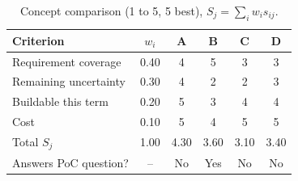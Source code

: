 \documentclass[conference]{IEEEtran}
\begin{document}
\begin{table}[H]
\centering
\footnotesize
\caption{Concept comparison (1 to 5, 5 best), $S_j=\sum_i w_i s_{ij}$.}
\label{tab:concepts}
\begin{tabular}{p{2.7cm}ccccc}
\toprule
\textbf{Criterion} & $w_i$ & \textbf{A} & \textbf{B} & \textbf{C} & \textbf{D} \\
\midrule
Requirement coverage  & 0.40 & 4 & 5 & 3 & 3 \\
Remaining uncertainty & 0.30 & 4 & 2 & 2 & 3 \\
Buildable this term   & 0.20 & 5 & 3 & 4 & 4 \\
Cost                  & 0.10 & 5 & 4 & 5 & 5 \\
\midrule
Total $S_j$           & 1.00 & 4.30 & 3.60 & 3.10 & 3.40 \\
Answers PoC question? & --   & No & Yes & No & No \\
\bottomrule
\end{tabular}
\end{table}
\end{document}
